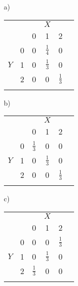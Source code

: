 \documentclass[twoside]{article}
\begin{document}
\begin{enumerate}
	\item[a)]
		\begin{tabular}{|cc|ccc|c|}\hline
				&		&	&$X$			&				&\\
				&		&0	&1				&2				&\\\hline
				&0	{}	&0	&$\frac{1}{4}$	&0				&\\
			$Y$	&1	{}	&0	&$\frac{1}{3}$	&0				&\\
				&2	{}	&0	&0				&$\frac{1}{3}$	&\\\hline
				&	{}	&	&				&				&\\\hline
		\end{tabular}
	\item[b)]
		\begin{tabular}{|cc|ccc|c|}\hline
				&		&	&$X$			&				&\\
				&		&0	&1				&2				&\\\hline
				&0	{}	&$\frac{1}{3}$	&0				&0				&\\
			$Y$	&1	{}	&0				&$\frac{1}{3}$	&0				&\\
				&2	{}	&0				&0				&$\frac{1}{3}$	&\\\hline
				&	{}	&				&				&				&\\\hline
		\end{tabular}
	\item[c)]
		\begin{tabular}{|cc|ccc|c|}\hline
				&		&	&$X$			&				&\\
				&		&0	&1				&2				&\\\hline
				&0	{}	&0				&0				&$\frac{1}{3}$	&\\
			$Y$	&1	{}	&0				&$\frac{1}{3}$	&0				&\\
				&2	{}	&$\frac{1}{3}$	&0				&0				&\\\hline
				&	{}	&				&				&				&\\\hline
		\end{tabular}
\end{enumerate}
\end{document}
